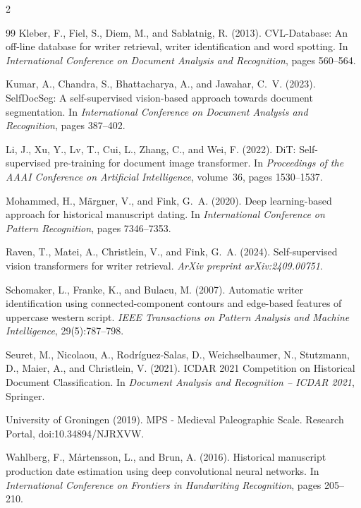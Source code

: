 \documentclass[12pt,a4paper]{article}
\begin{document}
\begin{multicols}{2}
\begin{thebibliography}{99}
Kleber, F., Fiel, S., Diem, M., and Sablatnig, R. (2013).
\newblock CVL-Database: An off-line database for writer retrieval, writer identification and word spotting.
\newblock In \textit{International Conference on Document Analysis and Recognition}, pages 560--564.

Kumar, A., Chandra, S., Bhattacharya, A., and Jawahar, C.~V. (2023).
\newblock SelfDocSeg: A self-supervised vision-based approach towards document segmentation.
\newblock In \textit{International Conference on Document Analysis and Recognition}, pages 387--402.

Li, J., Xu, Y., Lv, T., Cui, L., Zhang, C., and Wei, F. (2022).
\newblock DiT: Self-supervised pre-training for document image transformer.
\newblock In \textit{Proceedings of the AAAI Conference on Artificial Intelligence}, volume~36, pages 1530--1537.

Mohammed, H., Märgner, V., and Fink, G.~A. (2020).
\newblock Deep learning-based approach for historical manuscript dating.
\newblock In \textit{International Conference on Pattern Recognition}, pages 7346--7353.

Raven, T., Matei, A., Christlein, V., and Fink, G.~A. (2024).
\newblock Self-supervised vision transformers for writer retrieval.
\newblock \textit{ArXiv preprint arXiv:2409.00751}.

Schomaker, L., Franke, K., and Bulacu, M. (2007).
\newblock Automatic writer identification using connected-component contours and edge-based features of uppercase western script.
\newblock \textit{IEEE Transactions on Pattern Analysis and Machine Intelligence}, 29(5):787--798.

Seuret, M., Nicolaou, A., Rodríguez-Salas, D., Weichselbaumer, N., Stutzmann, D., Maier, A., and Christlein, V. (2021).
\newblock ICDAR 2021 Competition on Historical Document Classification.
\newblock In \textit{Document Analysis and Recognition – ICDAR 2021}, Springer.

University of Groningen (2019).
\newblock MPS - Medieval Paleographic Scale.
\newblock Research Portal, doi:10.34894/NJRXVW.

Wahlberg, F., Mårtensson, L., and Brun, A. (2016).
\newblock Historical manuscript production date estimation using deep convolutional neural networks.
\newblock In \textit{International Conference on Frontiers in Handwriting Recognition}, pages 205--210.

\end{thebibliography}

\end{multicols}
\end{document}
